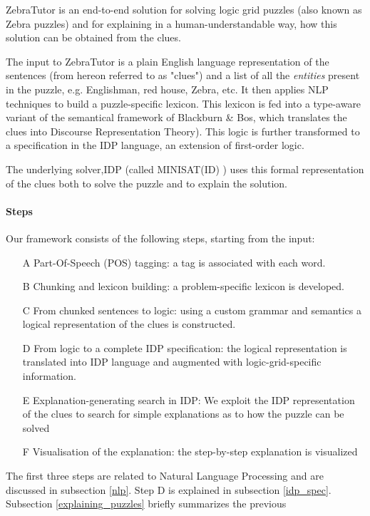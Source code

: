 ZebraTutor is an end-to-end solution for solving logic grid puzzles (also known as Zebra puzzles) and for explaining in a human-understandable way, how this solution can be obtained from the clues. 

The input to ZebraTutor is a plain English language representation of the sentences (from hereon referred to as "clues") and a list of all the \textit{entities} present in the puzzle, e.g. Englishman, red house, Zebra, etc. It then applies NLP techniques to build a puzzle-specific lexicon. This lexicon is fed into a type-aware variant of the semantical framework of Blackburn \& Bos, which translates the clues into Discourse Representation Theory). This logic is further transformed to a specification in the IDP language, an extension of first-order logic. 

The underlying solver,IDP (called
 MINISAT(ID) ) uses this formal representation of the clues both to  solve the puzzle and to explain the solution. 
 
\paragraph{Steps} Our framework consists of the following steps, starting from the input:
\begin{enumerate}
	\item[A] \label{steps_A} Part-Of-Speech (POS) tagging: a tag is associated with each word.
	\item[B] \label{steps_B} Chunking and lexicon building: a problem-specific lexicon is developed. 
	\item[C] \label{steps_C} From chunked sentences to logic: using a custom grammar and semantics a logical representation of the clues is constructed.
	\item[D] \label{steps_D} From logic to a complete IDP specification: the logical representation is translated into IDP language and augmented with logic-grid-specific information.
	\item[E] \label{steps_E} Explanation-generating search in IDP: We exploit the IDP representation of the clues to search for simple explanations as to how the puzzle can be solved
	\item[F] \label{steps_F} Visualisation of the explanation: the step-by-step explanation is visualized
\end{enumerate}
The first three steps are related to Natural Language Processing and are discussed in subsection \ref{nlp}. Step D is explained in subsection \ref{idp_spec}. Subsection \ref{explaining_puzzles} briefly summarizes the previous 


